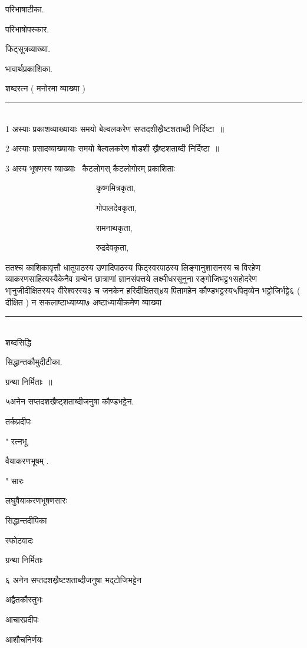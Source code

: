\documentclass[11pt, openany]{book}
\begin{document}
\begin{multicols}{2}
परिभाषाटीका. 

परिभाषोपस्कार. 

फिट्सूत्रव्याख्या. 

भावार्थप्रकाशिका. 

शब्दरत्न ( मनोरमा व्याख्या ) 

\noindent
\rule{1\linewidth}{0.5pt}\\

1 अस्याः प्रकाशव्याख्यायाः समयो बेल्वलकरेण सप्तदशीख्रैष्टशताब्दी निर्दिष्टा~॥ 

2 अस्याः प्रसादव्याख्यायाः समयो बेल्वलकरेण षोडशी ख्रैष्टशताब्दी निर्दिष्टा~॥ 

3 अस्य भूषणस्य व्याख्याः \textendash\ कैटलोगस् कैटलोगोरम् प्रकाशिताः \textendash\ 

~~~~~~~~~~~~~~~~~~~~~~कृष्णमित्रकृता, 

~~~~~~~~~~~~~~~~~~~~~~गोपालदेवकृता, 

~~~~~~~~~~~~~~~~~~~~~~रामनाथकृता, 

~~~~~~~~~~~~~~~~~~~~~~रुद्रदेवकृता,

\columnbreak

ततश्च काशिकावृत्तौ धातुपाठस्य उणादिपाठस्य फिट्स्वरपाठस्य लिङ्गानुशासनस्य च विरहेण व्याकरणसाहित्यस्यैकेनैव ग्रन्थेन छात्राणां ज्ञानसंपत्तये लक्ष्मीधरसूनुना रङ्गोजिभट्ट१सहोदरेण भा्नुजीदीक्षितस्य२ वीरेश्वरस्य३ च जनकेन हरिदीक्षितस्४य पितामहेन कौण्डभट्टस्य५पितृव्येन भट्टोजिर्भट्टे६ ( दीक्षित ) न सकलाष्टाध्याय्या७ अष्टाध्यायीक्रमेण व्याख्या \textendash\ 

\noindent
\rule{1\linewidth}{0.5pt}\\

शब्दसिद्धि 

सिद्धान्तकौमुदीटीका. 

ग्रन्था निर्मिताः~॥ 

५अनेन सप्तदशखैष्ट्शताब्दीजनुषा कौण्डभट्टेन. \textendash\ 

तर्कप्रदीपः

" रत्नभू. 

वैयाकरणभूषम् . 

" सारः

लघुवैयाकरणभूषणसारः 

सिद्धान्तदीपिका 

स्फोटवादः 

ग्रन्था निर्मिताः 

६ अनेन सप्तदशख्रैष्टशताब्दीजनुषा भद्टोजिभट्टेन \textendash\ 

अद्वैतकौस्तुभः 

आचारप्रदीपः 

आशौचनिर्णयः 


\end{multicols}
\end{document}
